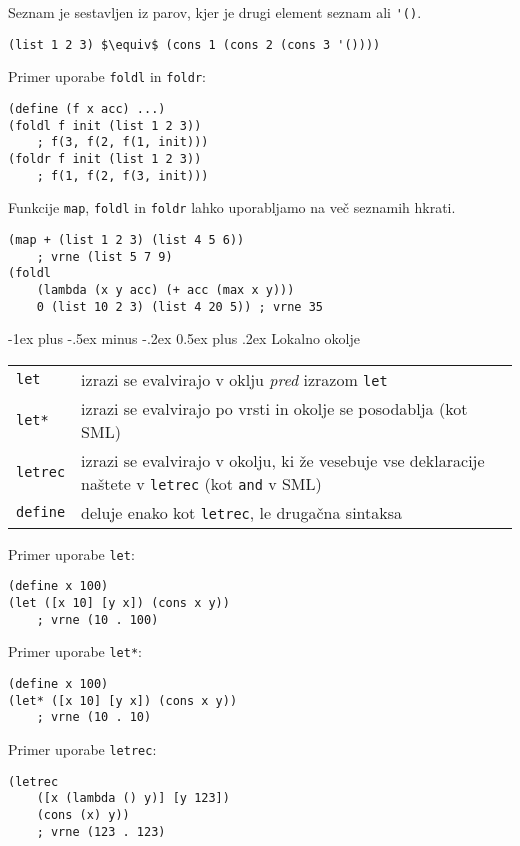 \documentclass[a3paper,9pt]{extarticle}
\makeatletter
\renewcommand{\section}{\@startsection{section}{1}{0mm}%
                                {-1ex plus -.5ex minus -.2ex}%
                                {0.5ex plus .2ex}%
                                {\normalfont\large\bfseries}}
\makeatother
\begin{document}
\begin{multicols}{4}
Seznam je sestavljen iz parov, kjer je drugi element seznam ali \lstinline|'()|.
\begin{lstlisting}
(list 1 2 3) $\equiv$ (cons 1 (cons 2 (cons 3 '())))
\end{lstlisting}

Primer uporabe \lstinline|foldl| in \lstinline|foldr|:
\begin{lstlisting}
(define (f x acc) ...)
(foldl f init (list 1 2 3)) 
    ; f(3, f(2, f(1, init)))
(foldr f init (list 1 2 3)) 
    ; f(1, f(2, f(3, init)))
\end{lstlisting}

Funkcije \lstinline|map|, \lstinline|foldl| in \lstinline|foldr| lahko uporabljamo na več seznamih hkrati.
\begin{lstlisting}
(map + (list 1 2 3) (list 4 5 6)) 
    ; vrne (list 5 7 9)
(foldl 
    (lambda (x y acc) (+ acc (max x y))) 
    0 (list 10 2 3) (list 4 20 5)) ; vrne 35 
\end{lstlisting}

\section{Lokalno okolje}
\begin{tabular}{@{}lp{8cm}@{}}
    \lstinline|let| & izrazi se evalvirajo v oklju \textit{pred} izrazom \lstinline|let|\\
    \lstinline|let*| & izrazi se evalvirajo po vrsti in okolje se posodablja (kot SML)\\
    \lstinline|letrec| & izrazi se evalvirajo v okolju, ki že vesebuje vse deklaracije naštete v \lstinline|letrec| (kot \lstinline|and| v SML)\\
    \lstinline|define| & deluje enako kot \lstinline|letrec|, le drugačna sintaksa
\end{tabular}

Primer uporabe \lstinline|let|:
\begin{lstlisting}
(define x 100)
(let ([x 10] [y x]) (cons x y)) 
    ; vrne (10 . 100)
\end{lstlisting}

Primer uporabe \lstinline|let*|:
\begin{lstlisting}
(define x 100)
(let* ([x 10] [y x]) (cons x y)) 
    ; vrne (10 . 10)
\end{lstlisting}

Primer uporabe \lstinline|letrec|:
\begin{lstlisting}
(letrec 
    ([x (lambda () y)] [y 123]) 
    (cons (x) y)) 
    ; vrne (123 . 123)
\end{lstlisting}


\end{multicols}
\end{document}
